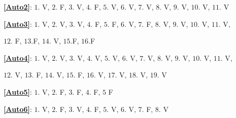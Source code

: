 \documentclass[a4paper,12pt,twopage]{book}
\begin{document}
\noindent 

\bigskip


\bigskip

\textbf{\ref{Auto2}}: $1.$ V, $2.$ F, $3.$ V, $4.$ F, $5.$ V, $ 6.$ V, $7.$ V, $8.$ V, $9.$ V, $10.$ V, $11.$ V 

\bigskip

\textbf{\ref{Auto3}}: $1.$ V, $2.$ V, $3.$ V, $4.$ F, $5.$ F, $6.$ V, $7.$ F, $ 8.$ V, $9.$ V, $10.$ V, $11.$ V, 

$12.$ F, $13.$F, $14.$ V, $ 15.$F, $16.$F

\bigskip

\textbf{\ref{Auto4}}: $1.$ V, $2.$ V, $3.$ V, $4.$ V, $5.$ V, $6.$ V, $7.$ V, $ 8.$ V, $9.$ V, $10.$ V, $11.$ V,  


 $12.$ V, $13.$ F, $14.$ V, $ 15.$ F, $ 16.$ V, $ 17.$ V, $18.$ V, $19.$ V

\bigskip

\textbf{\ref{Auto5}}: $1.$ V, $2.$ F, $3.$ F, $4.$ F, $5$ F

\bigskip

\textbf{\ref{Auto6}}: $1.$ V, $2.$ F, $3.$ V, $4.$ F, $5.$ V, $6.$ V, $7.$ F, $8.$ V
\end{document}
